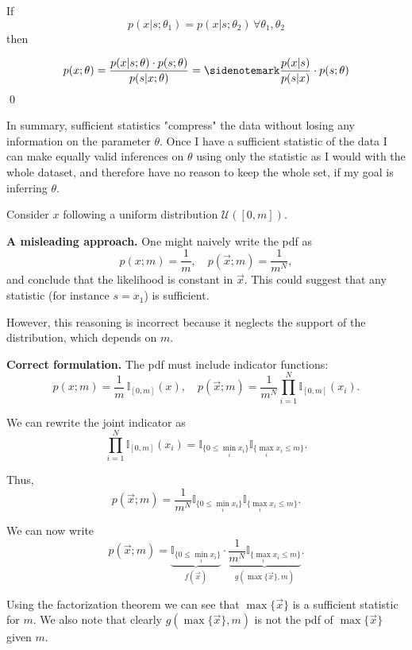 \begin{example}
	If
	\[
	p(x | s;\theta_1) = p(x | s;\theta_2) \, \forall \theta_1,\theta_2
	\]
	then 
	
	\[
	p(x;\theta)=\frac{p(x|s;\theta)\cdot p(s;\theta)}{p(s|x;\theta)} =\sidenotemark \frac{p(x|s)}{p(s|x)}\cdot p(s;\theta)
	\]
	\qed
\end{example}

In summary, sufficient statistics "compress" the data without losing any information on the parameter $\theta$. Once I have a sufficient statistic of the data I can make equally valid inferences on $\theta$ using only the statistic as I would with the whole dataset, and therefore have no reason to keep the whole set, if my goal is inferring $\theta$. 

\begin{example}\label{ex:uniform_sufficient_statistics}
	Consider $x$ following a uniform distribution $\mathcal{U}([0,m])$.
	
	\textbf{A misleading approach.} One might naively write the pdf as
	\[
	p(x;m)=\frac{1}{m}, 
	\quad
	p(\vec{x};m)=\frac{1}{m^N},
	\]
	and conclude that the likelihood is constant in $\vec{x}$. This could suggest that any statistic (for instance $s=x_1$) is sufficient.
	
	However, this reasoning is incorrect because it neglects the support of the distribution, which depends on $m$.

	\textbf{Correct formulation.} The pdf must include indicator functions:
	\[
	p(x;m)=\frac{1}{m}\,\mathbb{I}_{[0,m]}(x),
	\quad
	p(\vec{x};m)=\frac{1}{m^N}\prod_{i=1}^N \mathbb{I}_{[0,m]}(x_i).
	\]
	
	We can rewrite the joint indicator as
	\[
	\prod_{i=1}^N \mathbb{I}_{[0,m]}(x_i)
	=
	\mathbb{I}_{\{0 \le \min_i x_i\}}
	\mathbb{I}_{\{\max_i x_i \le m\}}.
	\]
	
	Thus,
	\[
	p(\vec{x};m)
	=
	\frac{1}{m^N}
	\mathbb{I}_{\{0 \le \min_i x_i\}}
	\mathbb{I}_{\{\max_i x_i \le m\}}.
	\]

	We can now write
	\[
	p(\vec{x};m)
	=
	\underbrace{\mathbb{I}_{\{0 \le \min_i x_i\}}}_{f(\vec{x})}
	\cdot
	\underbrace{\frac{1}{m^N}\mathbb{I}_{\{\max_i x_i \le m\}}}_{g(\max\{\vec{x}\},m)}.
	\]
	
	Using the factorization theorem we can see that $\max\{\vec{x}\}$ is a sufficient statistic for $m$. We also note that clearly $g(\max\{\vec{x}\},m)$ is not the pdf of $\max\{\vec{x}\}$ given $m$.
\end{example}

